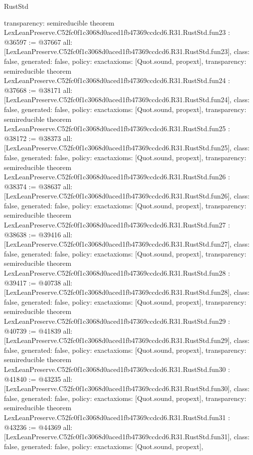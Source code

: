 \begin{lexlean}{RustStd}
\begin{coremodule}
{  transparency: semireducible
}
theorem LexLeanPreserve.C52fc0f1c3068d0aced1fb47369ccdcd6.R31.RustStd.fun23 : @36597 := @37667 {
  all: [LexLeanPreserve.C52fc0f1c3068d0aced1fb47369ccdcd6.R31.RustStd.fun23],
  class: false,
  generated: false,
  policy: exact{axioms: [Quot.sound, propext]},
  transparency: semireducible
}
theorem LexLeanPreserve.C52fc0f1c3068d0aced1fb47369ccdcd6.R31.RustStd.fun24 : @37668 := @38171 {
  all: [LexLeanPreserve.C52fc0f1c3068d0aced1fb47369ccdcd6.R31.RustStd.fun24],
  class: false,
  generated: false,
  policy: exact{axioms: [Quot.sound, propext]},
  transparency: semireducible
}
theorem LexLeanPreserve.C52fc0f1c3068d0aced1fb47369ccdcd6.R31.RustStd.fun25 : @38172 := @38373 {
  all: [LexLeanPreserve.C52fc0f1c3068d0aced1fb47369ccdcd6.R31.RustStd.fun25],
  class: false,
  generated: false,
  policy: exact{axioms: [Quot.sound, propext]},
  transparency: semireducible
}
theorem LexLeanPreserve.C52fc0f1c3068d0aced1fb47369ccdcd6.R31.RustStd.fun26 : @38374 := @38637 {
  all: [LexLeanPreserve.C52fc0f1c3068d0aced1fb47369ccdcd6.R31.RustStd.fun26],
  class: false,
  generated: false,
  policy: exact{axioms: [Quot.sound, propext]},
  transparency: semireducible
}
theorem LexLeanPreserve.C52fc0f1c3068d0aced1fb47369ccdcd6.R31.RustStd.fun27 : @38638 := @39416 {
  all: [LexLeanPreserve.C52fc0f1c3068d0aced1fb47369ccdcd6.R31.RustStd.fun27],
  class: false,
  generated: false,
  policy: exact{axioms: [Quot.sound, propext]},
  transparency: semireducible
}
theorem LexLeanPreserve.C52fc0f1c3068d0aced1fb47369ccdcd6.R31.RustStd.fun28 : @39417 := @40738 {
  all: [LexLeanPreserve.C52fc0f1c3068d0aced1fb47369ccdcd6.R31.RustStd.fun28],
  class: false,
  generated: false,
  policy: exact{axioms: [Quot.sound, propext]},
  transparency: semireducible
}
theorem LexLeanPreserve.C52fc0f1c3068d0aced1fb47369ccdcd6.R31.RustStd.fun29 : @40739 := @41839 {
  all: [LexLeanPreserve.C52fc0f1c3068d0aced1fb47369ccdcd6.R31.RustStd.fun29],
  class: false,
  generated: false,
  policy: exact{axioms: [Quot.sound, propext]},
  transparency: semireducible
}
theorem LexLeanPreserve.C52fc0f1c3068d0aced1fb47369ccdcd6.R31.RustStd.fun30 : @41840 := @43235 {
  all: [LexLeanPreserve.C52fc0f1c3068d0aced1fb47369ccdcd6.R31.RustStd.fun30],
  class: false,
  generated: false,
  policy: exact{axioms: [Quot.sound, propext]},
  transparency: semireducible
}
theorem LexLeanPreserve.C52fc0f1c3068d0aced1fb47369ccdcd6.R31.RustStd.fun31 : @43236 := @44369 {
  all: [LexLeanPreserve.C52fc0f1c3068d0aced1fb47369ccdcd6.R31.RustStd.fun31],
  class: false,
  generated: false,
  policy: exact{axioms: [Quot.sound, propext]},
}
\end{coremodule}
\end{lexlean}
